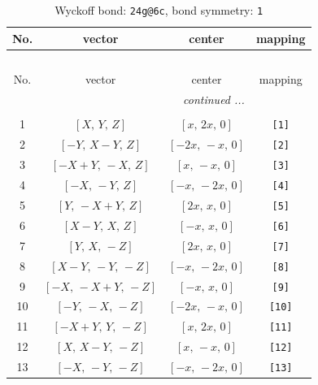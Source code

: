 \documentclass[fleqn,8pt]{jsarticle}
\begin{document}
\begin{longtable}{cccc}
\caption{Wyckoff bond: {\tt 24g@6c}, bond symmetry: {\tt 1}}
 \\
 \hline \hline
No. & vector & center & mapping \\ \hline \endfirsthead

\multicolumn{3}{l}{\tablename\ \thetable{}} \\
 \hline \hline
No. & vector & center & mapping \\ \hline \endhead

 \hline \hline
\multicolumn{3}{r}{\footnotesize\it continued ...} \\ \endfoot

 \hline \hline
\multicolumn{3}{r}{} \\ \endlastfoot

1 & $\left[ X,\, Y,\, Z \right]$ & $\left[ x,\, 2 x,\, 0 \right]$ & {\tt [1]} \\ \hline
2 & $\left[ - Y,\, X - Y,\, Z \right]$ & $\left[ - 2 x,\, - x,\, 0 \right]$ & {\tt [2]} \\ \hline
3 & $\left[ - X + Y,\, - X,\, Z \right]$ & $\left[ x,\, - x,\, 0 \right]$ & {\tt [3]} \\ \hline
4 & $\left[ - X,\, - Y,\, Z \right]$ & $\left[ - x,\, - 2 x,\, 0 \right]$ & {\tt [4]} \\ \hline
5 & $\left[ Y,\, - X + Y,\, Z \right]$ & $\left[ 2 x,\, x,\, 0 \right]$ & {\tt [5]} \\ \hline
6 & $\left[ X - Y,\, X,\, Z \right]$ & $\left[ - x,\, x,\, 0 \right]$ & {\tt [6]} \\ \hline
7 & $\left[ Y,\, X,\, - Z \right]$ & $\left[ 2 x,\, x,\, 0 \right]$ & {\tt [7]} \\ \hline
8 & $\left[ X - Y,\, - Y,\, - Z \right]$ & $\left[ - x,\, - 2 x,\, 0 \right]$ & {\tt [8]} \\ \hline
9 & $\left[ - X,\, - X + Y,\, - Z \right]$ & $\left[ - x,\, x,\, 0 \right]$ & {\tt [9]} \\ \hline
10 & $\left[ - Y,\, - X,\, - Z \right]$ & $\left[ - 2 x,\, - x,\, 0 \right]$ & {\tt [10]} \\ \hline
11 & $\left[ - X + Y,\, Y,\, - Z \right]$ & $\left[ x,\, 2 x,\, 0 \right]$ & {\tt [11]} \\ \hline
12 & $\left[ X,\, X - Y,\, - Z \right]$ & $\left[ x,\, - x,\, 0 \right]$ & {\tt [12]} \\ \hline
13 & $\left[ - X,\, - Y,\, - Z \right]$ & $\left[ - x,\, - 2 x,\, 0 \right]$ & {\tt [13]} \\ \hline

\end{longtable}
\end{document}
